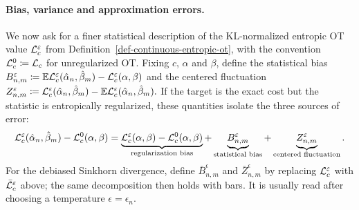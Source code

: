 \paragraph{Bias, variance and approximation errors.}
We now ask for a finer statistical description of the KL-normalized entropic OT value \(\mathcal{L}_c^\varepsilon\) from Definition~\ref{def-continuous-entropic-ot}, with the convention
\(\mathcal{L}_c^0\coloneqq\mathcal{L}_c\) for unregularized OT\@. Fixing \(c\), \(\alpha\) and \(\beta\), define the statistical bias
\(B_{n,m}^\varepsilon \coloneqq \mathbb{E} \mathcal{L}_c^\varepsilon(\hat\alpha_n,\hat\beta_m) -\mathcal{L}_c^\varepsilon(\alpha,\beta)\)
and the centered fluctuation
\(Z_{n,m}^\varepsilon \coloneqq \mathcal{L}_c^\varepsilon(\hat\alpha_n,\hat\beta_m) -\mathbb{E} \mathcal{L}_c^\varepsilon(\hat\alpha_n,\hat\beta_m).\)
If the target is the exact cost but the statistic is entropically regularized, these quantities isolate the three sources of error:
\[
\mathcal{L}_c^\varepsilon(\hat\alpha_n,\hat\beta_m)-\mathcal{L}_c^0(\alpha,\beta)
=
\underbrace{\mathcal{L}_c^\varepsilon(\alpha,\beta)-\mathcal{L}_c^0(\alpha,\beta)}_{\text{regularization bias}}
+
\underbrace{B_{n,m}^\varepsilon}_{\text{statistical bias}}
+
\underbrace{Z_{n,m}^\varepsilon}_{\text{centered fluctuation}}.
\]
For the debiased Sinkhorn divergence, define \(\bar B_{n,m}^\epsilon\) and \(\bar Z_{n,m}^\epsilon\) by replacing \(\mathcal{L}_c^\varepsilon\) with \(\bar{\mathcal{L}}_c^\varepsilon\) above; the same decomposition then holds with bars. It is usually read after choosing a temperature \(\epsilon=\epsilon_n\).

